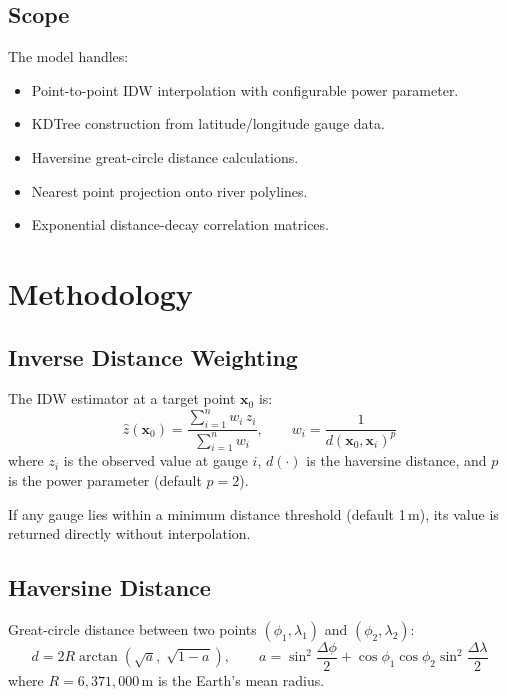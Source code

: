 \documentclass[11pt,a4paper]{article}
\begin{document}
\subsection{Scope}

The model handles:
\begin{itemize}[nosep]
    \item Point-to-point IDW interpolation with configurable power parameter.
    \item KDTree construction from latitude/longitude gauge data.
    \item Haversine great-circle distance calculations.
    \item Nearest point projection onto river polylines.
    \item Exponential distance-decay correlation matrices.
\end{itemize}


\section{Methodology}

\subsection{Inverse Distance Weighting}

The IDW estimator at a target point $\mathbf{x}_0$ is:
\begin{equation}
    \hat{z}(\mathbf{x}_0) = \frac{\sum_{i=1}^{n} w_i \, z_i}{\sum_{i=1}^{n} w_i}, \qquad
    w_i = \frac{1}{d(\mathbf{x}_0, \mathbf{x}_i)^p}
\end{equation}
where $z_i$ is the observed value at gauge $i$, $d(\cdot)$ is the haversine
distance, and $p$ is the power parameter (default $p=2$).

If any gauge lies within a minimum distance threshold (default 1\,m), its
value is returned directly without interpolation.

\subsection{Haversine Distance}

Great-circle distance between two points $(\phi_1, \lambda_1)$ and
$(\phi_2, \lambda_2)$:
\begin{equation}
    d = 2R \arctan\!\left(\sqrt{a},\; \sqrt{1-a}\right), \qquad
    a = \sin^2\!\frac{\Delta\phi}{2} + \cos\phi_1 \cos\phi_2 \sin^2\!\frac{\Delta\lambda}{2}
\end{equation}
where $R = 6{,}371{,}000$\,m is the Earth's mean radius.
\end{document}
